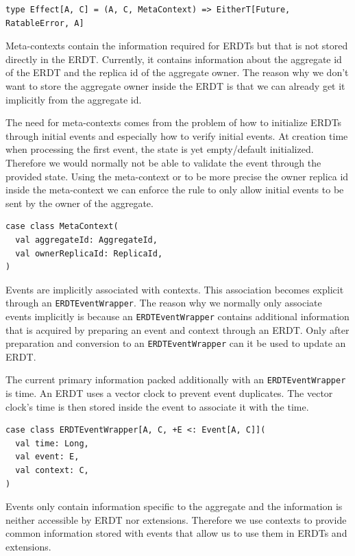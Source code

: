 \documentclass[
	english,
	ruledheaders=section,   %
	class=report,		    %
	thesis={type=bachelor}, %
	accentcolor=9c,			%
	custommargins=true,    %
	marginpar=false,        %
	parskip=half-,          %
	fontsize=11pt,          %
]{tudapub}
\begin{document}
\begin{lstlisting}
type Effect[A, C] = (A, C, MetaContext) => EitherT[Future, RatableError, A]
\end{lstlisting}

Meta-contexts contain the information required for ERDTs but that is not stored directly in the ERDT. Currently, it contains information about the aggregate id of the ERDT and the replica id of the aggregate owner. The reason why we don't want to store the aggregate owner inside the ERDT is that we can already get it implicitly from the aggregate id.

The need for meta-contexts comes from the problem of how to initialize ERDTs through initial events and especially how to verify initial events. At creation time when processing the first event, the state is yet empty/default initialized. Therefore we would normally not be able to validate the event through the provided state. Using the meta-context or to be more precise the owner replica id inside the meta-context we can enforce the rule to only allow initial events to be sent by the owner of the aggregate.

\begin{lstlisting}
case class MetaContext(
  val aggregateId: AggregateId,
  val ownerReplicaId: ReplicaId,
)
\end{lstlisting}

Events are implicitly associated with contexts. This association becomes explicit through an \texttt{ERDTEventWrapper}. The reason why we normally only associate events implicitly is because an \texttt{ERDTEventWrapper} contains additional information that is acquired by preparing an event and context through an ERDT. Only after preparation and conversion to an \texttt{ERDTEventWrapper} can it be used to update an ERDT. 

The current primary information packed additionally with an \texttt{ERDTEventWrapper} is time. An ERDT uses a vector clock to prevent event duplicates. The vector clock's time is then stored inside the event to associate it with the time.

\begin{lstlisting}
case class ERDTEventWrapper[A, C, +E <: Event[A, C]](
  val time: Long,
  val event: E,
  val context: C,
)
\end{lstlisting}

 \label{sec:context}
Events only contain information specific to the aggregate and the information is neither accessible by ERDT nor extensions. Therefore we use contexts to provide common information stored with events that allow us to use them in ERDTs and extensions. 
\end{document}
